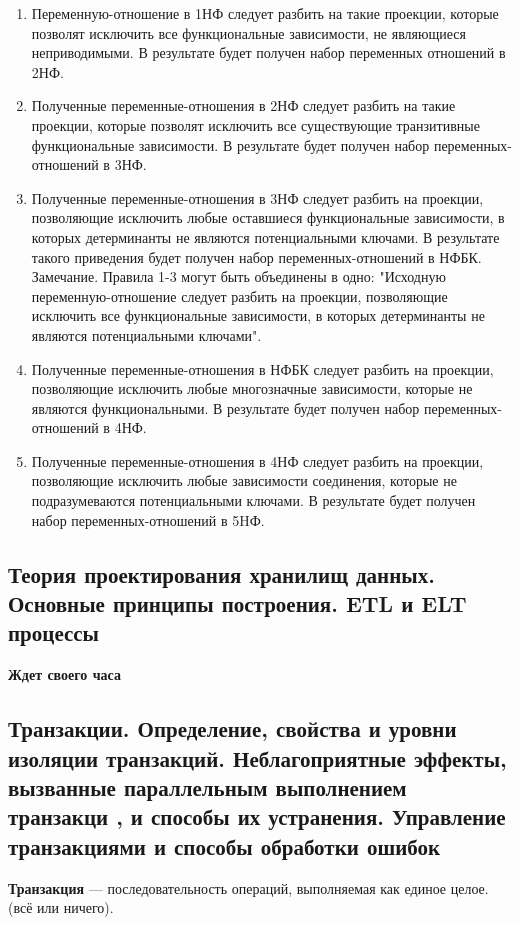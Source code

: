 \begin{enumerate}
	\item Переменную-отношение в 1НФ следует разбить на такие проекции, которые позволят исключить все функциональные зависимости, не являющиеся неприводимыми. В результате будет получен набор переменных отношений в 2НФ.
	\item Полученные переменные-отношения в 2НФ следует разбить на такие проекции, которые позволят исключить все существующие транзитивные функциональные зависимости. В результате будет получен набор переменных-отношений в 3НФ.
	\item Полученные переменные-отношения в 3НФ следует разбить на проекции, позволяющие исключить любые
	оставшиеся функциональные зависимости, в которых детерминанты не являются потенциальными ключами. В результате такого приведения будет получен набор переменных-отношений в НФБК. 
	Замечание.
	Правила 1-3 могут быть объединены в одно: "Исходную переменную-отношение следует разбить на проекции, позволяющие исключить все функциональные зависимости, в которых детерминанты не являются
	потенциальными ключами".
	\item Полученные переменные-отношения в НФБК следует разбить на проекции, позволяющие исключить любые многозначные зависимости, которые не являются функциональными. В результате будет получен
	набор переменных- отношений в 4НФ.
	\item Полученные переменные-отношения в 4НФ следует разбить на проекции, позволяющие исключить любые зависимости соединения, которые не подразумеваются потенциальными ключами. В результате будет
	получен набор переменных-отношений в 5HФ.
\end{enumerate} 


\subsection{Теория проектирования хранилищ данных. Основные принципы построения. ETL и ELT процессы}

\textbf{Ждет своего часа}

\subsection{Транзакции. Определение, свойства и уровни изоляции транзакций. Неблагоприятные эффекты, вызванные параллельным выполнением транзакци , и способы их устранения. Управление транзакциями и способы обработки ошибок}

\textbf{Транзакция} --- последовательность операций, выполняемая как единое целое. (всё или ничего).

